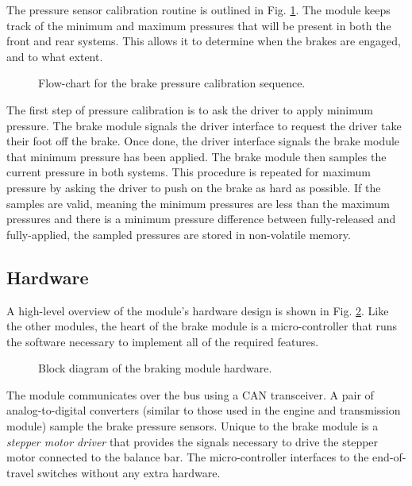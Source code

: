 The pressure sensor calibration routine is outlined in Fig. \ref{fig:brake_pressure_calibration_flow}. The module keeps track of the minimum and maximum pressures that will be present in both the front and rear systems. This allows it to determine when the brakes are engaged, and to what extent.

\vspace{0.5em}
\begin{figure}[H]
	\centering
	
	\caption{Flow-chart for the brake pressure calibration sequence.}
	\label{fig:brake_pressure_calibration_flow}
\end{figure}

The first step of pressure calibration is to ask the driver to apply minimum pressure. The brake module signals the driver interface to request the driver take their foot off the brake. Once done, the driver interface signals the brake module that minimum pressure has been applied. The brake module then samples the current pressure in both systems. This procedure is repeated for maximum pressure by asking the driver to push on the brake as hard as possible. If the samples are valid, meaning the minimum pressures are less than the maximum pressures and there is a minimum pressure difference between fully-released and fully-applied, the sampled pressures are stored in non-volatile memory.

\subsection{Hardware}

A high-level overview of the module's hardware design is shown in Fig. \ref{fig:brake_hardware_design_block}. Like the other modules, the heart of the brake module is a micro-controller that runs the software necessary to implement all of the required features. 

\vspace{1em}
\begin{figure}[H]
\centering

\caption{Block diagram of the braking module hardware.}
\label{fig:brake_hardware_design_block}
\end{figure}

The module communicates over the bus using a CAN transceiver. A pair of analog-to-digital converters (similar to those used in the engine and transmission module) sample the brake pressure sensors. Unique to the brake module is a \emph{stepper motor driver} that provides the signals necessary to drive the stepper motor connected to the balance bar. The micro-controller interfaces to the end-of-travel switches without any extra hardware.

